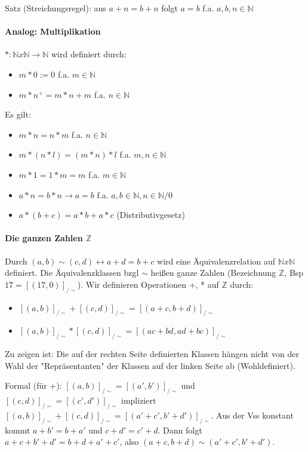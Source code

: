 \documentclass[10pt,landscape]{article}
\begin{document}
\begin{multicols}{3}
Satz (Streichungsregel): aus $a+n=b+n$ folgt $a=b$ f.a. $a,b,n\in\mathbb{N}$

\paragraph{Analog: Multiplikation}
$*: \mathbb{N} x \mathbb{N} \rightarrow \mathbb{N}$ wird definiert durch:
\begin{itemize}
    \item $m*0:=0$ f.a. $m\in \mathbb{N}$
    \item $m*n^+=m*n+m$ f.a. $n\in\mathbb{N}$
\end{itemize}
Es gilt:
\begin{itemize}
    \item $m*n=n*m$ f.a. $n\in\mathbb{N}$
    \item $m*(n*l)=(m*n)*l$ f.a. $m,n\in\mathbb{N}$
    \item $m*1 = 1*m =m$ f.a. $m\in\mathbb{N}$
    \item $a*n=b*n \rightarrow a=b$ f.a. $a,b\in\mathbb{N}, n\in\mathbb{N}/{0}$
    \item $a*(b+c)=a*b+a*c$ (Distributivgesetz)
\end{itemize}

\paragraph{Die ganzen Zahlen $\mathbb{Z}$}
Durch $(a,b)\sim (c,d)\leftrightarrow a+d=b+c$ wird eine Äquivalenzrelation auf $\mathbb{N} x\mathbb{N}$ definiert.
Die Äquivalenzklassen bzgl $\sim$ heißen ganze Zahlen (Bezeichnung $\mathbb{Z}$, Bsp $17=[(17,0)]_{/\sim }$).
Wir definieren Operationen +, * auf $\mathbb{Z}$ durch:
\begin{itemize}
    \item $[(a,b)]_{/\sim } + [(c,d)]_{/\sim } = [(a+c, b+d)]_{/\sim }$
    \item $[(a,b)]_{/\sim } * [(c,d)]_{/\sim } = [(ac+bd, ad+bc)]_{/\sim }$
\end{itemize}
Zu zeigen ist: Die auf der rechten Seite definierten Klassen hängen nicht von der Wahl der "Repräsentanten" der Klassen auf der linken Seite ab (Wohldefiniert).

Formal (für +): $[(a,b)]_{/\sim } = [(a',b')]_{/\sim }$ und $[(c,d)]_{/\sim } = [(c',d')]_{/\sim }$ impliziert $[(a,b)]_{/\sim } + [(c,d)]_{/\sim } = [(a'+c', b'+d')]_{/\sim }$. Aus der Vss konstant kommt $a+b'=b+a'$ und $c+d'=c'+d$. Dann folgt $a+c+b'+d'=b+d+a'+c'$, also $(a+c, b+d)\sim (a'+c',b'+d')$.


\end{multicols}
\end{document}
